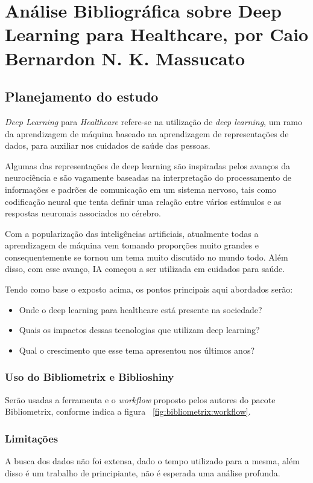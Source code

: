 \chapter{Análise Bibliográfica sobre Deep Learning para Healthcare, por Caio Bernardon N. K. Massucato\label{chap:bibliometria:CaioMassucato}}

\section{Planejamento do estudo}

\textit{Deep Learning} para \textit{Healthcare} refere-se na utilização de \textit{deep learning}, um ramo da aprendizagem de máquina baseado na aprendizagem de representações de dados, para auxiliar nos cuidados de saúde das pessoas.

Algumas das representações de deep learning são inspiradas pelos avanços da neurociência e são vagamente baseadas na interpretação do processamento de informações e padrões de comunicação em um sistema nervoso, tais como codificação neural que tenta definir uma relação entre vários estímulos e as respostas neuronais associados no cérebro.

Com a popularização das inteligências artificiais, atualmente todas a aprendizagem de máquina vem tomando proporções muito grandes e consequentemente se tornou um tema muito discutido no mundo todo. Além disso, com esse avanço, IA começou a ser utilizada em cuidados para saúde.

Tendo como base o exposto acima, os pontos principais aqui abordados serão:
\begin{itemize}
    \item Onde o deep learning para healthcare está presente na sociedade?
    \item Quais os impactos dessas tecnologias que utilizam deep learning?
    \item Qual o crescimento que esse tema apresentou nos últimos anos?
\end{itemize}

\subsection{Uso do Bibliometrix e Biblioshiny}
Serão usadas a ferramenta e o \textit{workflow} proposto pelos autores do pacote Bibliometrix, conforme indica a figura ~\ref{fig:bibliometrix:workflow}.

\subsection{Limitações} A busca dos dados não foi extensa, dado o tempo utilizado para a mesma, além disso é um trabalho de principiante, não é esperada uma análise profunda.


